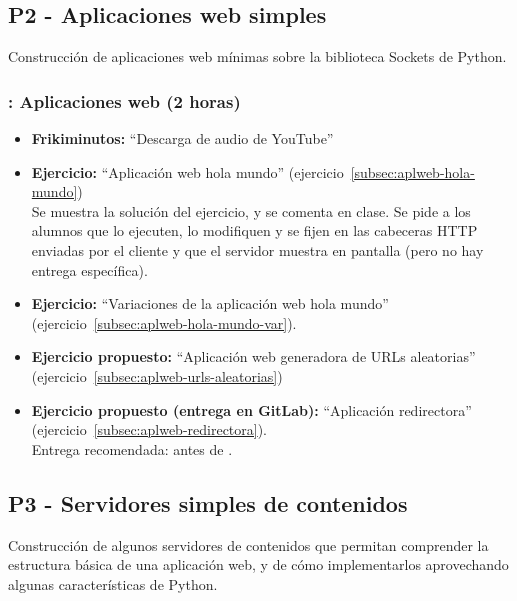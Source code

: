 \documentclass[a4paper,12pt]{article}
\begin{document}
\subsection{P2 - Aplicaciones web simples}


Construcción de aplicaciones web mínimas sobre la biblioteca Sockets de Python.


\subsubsection{\martesD: Aplicaciones web (2 horas)}
\label{cal:martesD}

\begin{itemize}
\item \textbf{Frikiminutos:} ``Descarga de audio de YouTube''
\item \textbf{Ejercicio:} ``Aplicación web hola mundo'' (ejercicio~\ref{subsec:aplweb-hola-mundo}) \\
   Se muestra la solución del ejercicio, y se comenta en clase. Se pide a los alumnos que lo ejecuten, lo modifiquen y se fijen en las cabeceras HTTP enviadas por el cliente y que el servidor muestra en pantalla (pero no hay entrega específica).
 \item \textbf{Ejercicio:} ``Variaciones de la aplicación web hola mundo'' (ejercicio~\ref{subsec:aplweb-hola-mundo-var}).
\item \textbf{Ejercicio propuesto:} ``Aplicación web generadora de URLs aleatorias'' (ejercicio~\ref{subsec:aplweb-urls-aleatorias})
\item \textbf{Ejercicio propuesto (entrega en GitLab):} ``Aplicación redirectora'' (ejercicio~\ref{subsec:aplweb-redirectora}). \\
   Entrega recomendada: antes de \martesE.
\end{itemize}


\subsection{P3 - Servidores simples de contenidos}

Construcción de algunos servidores de contenidos que permitan comprender la estructura básica de una aplicación web, y de cómo implementarlos aprovechando algunas características de Python.
\end{document}
